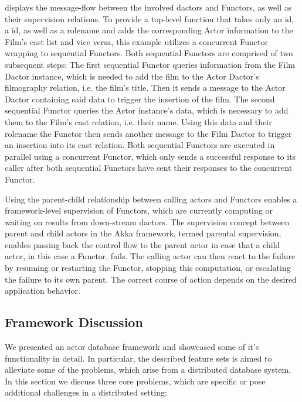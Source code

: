  displays the message-flow between the involved \glspl{dactor} and Functors, as well as their supervision relations.
To provide a top-level function that takes only an  id, a  id, as well as a rolename and adds the corresponding Actor information to the Film's cast list and vice versa, this example utilizes a concurrent Functor wrapping to sequential Functors.
Both sequential Functors are comprised of two subsequent steps:
The first sequential Functor queries information from the Film Dactor instance, which is needed to add the film to the Actor Dactor's filmography \gls{relation}, i.e. the film's title.
Then it sends a message to the Actor Dactor containing said data to trigger the insertion of the film.
The second sequential Functor queries the Actor instance's data, which is necessary to add them to the Film's cast \gls{relation}, i.e. their name.
Using this data and their rolename the Functor then sends another message to the Film Dactor to trigger an insertion into its cast \gls{relation}.
Both sequential Functors are executed in parallel using a concurrent Functor, which only sends a successful response to its caller after both sequential Functors have sent their responses to the concurrent Functor.

Using the parent-child relationship between calling actors and Functors enables a framework-level supervision of Functors, which are currently computing or waiting on results from down-stream \glspl{dactor}.
The supervision concept between parent and child actors in the Akka framework, termed parental supervision, enables passing back the control flow to the parent actor in case that a child actor, in this case a Functor, fails.
The calling actor can then react to the failure by resuming or restarting the Functor, stopping this computation, or escalating the failure to its own parent.
The correct course of action depends on the desired application behavior.

\subsection[Framework Discussion]{Framework Discussion}\label{subsec:framework_discussion}

We presented an actor database framework and showcased some of it's functionality in detail.
In particular, the described feature sets is aimed to alleviate some of the problems, which arise from a distributed database system.
In this section we discuss three core problems, which are specific or pose additional challenges in a distributed setting:

